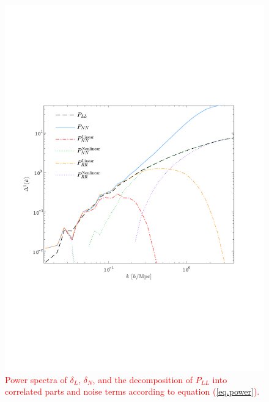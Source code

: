 \documentclass[aps,prd,twocolumn,superscriptaddress,amsfont,amssymb,amsmath,nofootinbib,showpacs,balancelastpage]{revtex4-1}
\newcommand{\tcr}{\textcolor{red}}
\begin{document}
\begin{figure}[t] \centering
  \includegraphics[width=1.0\linewidth]{power.pdf}
  \caption{\tcr{Power spectra of $\delta_L$, $\delta_N$, and the decomposition
  of $P_{LL}$ into correlated parts and noise terms according to equation
  (\ref{eq.power}).}}
  \label{fig.recopower}
\end{figure}
\end{document}

